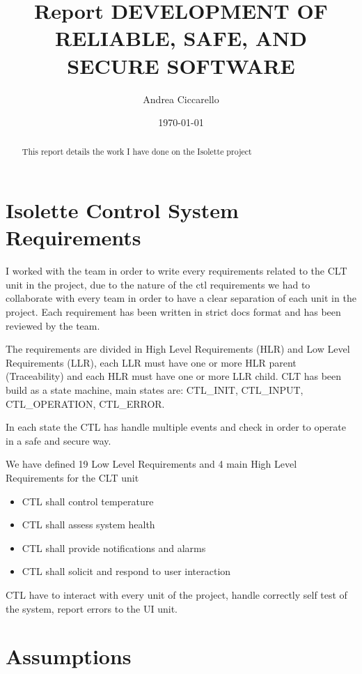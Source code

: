 \documentclass[a4paper, 12pt]{article}
\title{Report DEVELOPMENT OF RELIABLE, SAFE, AND SECURE SOFTWARE}
\author{Andrea Ciccarello}
\date{\today}
\begin{document}
\maketitle

\begin{abstract}
This report details the work I have done on the Isolette project
\end{abstract}

\tableofcontents

\section{Isolette Control System Requirements}

I worked with the team in order to write every requirements related to the CLT unit in the project,
due to the nature of the ctl requirements we had to collaborate with every team in order to have a clear
separation of each unit in the project.
Each requirement has been written in strict docs format and has been reviewed by the team.

The requirements are divided in High Level Requirements (HLR) and Low Level Requirements (LLR),
each LLR must have one or more HLR parent (Traceability) and each HLR must have one or more LLR child.
CLT has been build as a state machine, main states are: CTL\_INIT, CTL\_INPUT, CTL\_OPERATION, CTL\_ERROR.

In each state the CTL has handle multiple events and check in order to operate in a safe and secure way.

We have defined 19 Low Level Requirements and 4 main High Level Requirements for the CLT unit

\begin{itemize}
    \item CTL shall control temperature
    \item CTL shall assess system health
    \item CTL shall provide notifications and alarms
    \item CTL shall solicit and respond to user interaction
\end{itemize}

CTL have to interact with every unit of the project, handle correctly self test of the system, report errors to the UI unit.

\section{Assumptions}
\end{document}
